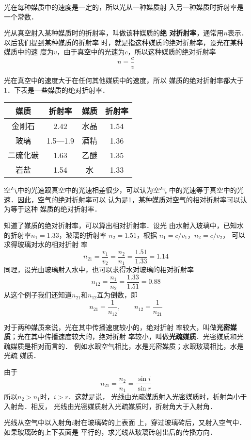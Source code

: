     光在每种媒质中的速度是一定的，所以光从一种媒质射
    入另一种媒质时折射率是一个常数．

    光从真空射入某种媒质时的折射率，叫做该种媒质的\textbf{绝
    对折射率}，通常用$n$表示．以后我们提到某种媒质的折射率
    时，就是指这种媒质的绝对折射率，设光在某种媒质中的速
    度为$v$，由于真空中的光速为$c$，所以这种媒质的绝对折射率
\[n=\frac{c}{v} \]

    光在真空中的速度大于在任何其他媒质中的速度，所以
    媒质的绝对折射率都大于1．下表是一些媒质的绝对折射率．
    \begin{center}
        \begin{tabular}{cccc}
        \hline
            媒质 & 折射率 & 媒质 & 折射率\\
        \hline
  金刚石  &  2.42 &  水晶   & 1.54\\
  玻璃   &   1.5—1.9  &  酒精  &  1.36\\
  二硫化碳  & 1.63  &  乙醚  &  1.35\\
  岩盐  &  1.54  &  水   &  1.33\\ 
        \hline
            \end{tabular}
        \end{center}

空气中的光速跟真空中的光速相差很少，可以认为空气
中的光速等于真空中的光速．因此，空气的绝对折射率可以
认为是1，某种媒质对空气的相对折射率可以认为等于这种
媒质的绝对折射率．

知道了媒质的绝对折射率，可以算出相对折射率．设光
由水射入玻璃中，已知水的折射率$n_1=1.33$，玻璃的折射率
$n_2=1.51$，根据
$n_1=c/v_1$，$n_2=c/v_2$，
可以求得玻璃对水的相对折射
率
$$n_{21}=\frac{v_1}{v_2}=\frac{n_2}{n_1}=\frac{1.51}{1.33}=1.14$$
同理，设光由玻璃射入水中，也可以求得水对玻璃的相对折射率
\[n_{12}=\frac{n_1}{n_2}=\frac{1.33}{1.51}=0.88 \]
从这个例子我们还知道$n_{21}$和$n_{12}$互为倒数，即
\[n_{21}=\frac{1}{n_{12}},\qquad n_{12}=\frac{1}{n_{21}}  \]

对于两种媒质来说，光在其中传播速度较小的，绝对折射
率较大，叫做\textbf{光密媒质}；光在其中传播速度较大的，绝对折射
率较小，叫做\textbf{光疏媒质}．光密媒质和光疏媒质是相对而言的．
例如水跟空气相比，水是光密媒质；水跟玻璃相比，水是光疏
媒质．

由于
\[n_{21}=\frac{n_2}{n_1}=\frac{\sin i}{\sin r} \]
所以$n_2>n_1$时，$i>r$．这就是说，
光线由光疏媒质射入光密媒质时，折射角小于入射角．相反，
光线由光密媒质射入光疏媒质时，折射角大于入射角．

\begin{example}
    光线从空气中以入射角$i$射在玻璃砖的上表面
    上，穿过玻璃砖后，又射入空气中．如果玻璃砖的上下表面是
    平行的，求光线从玻璃砖射出后的传播方向．
\end{example}

